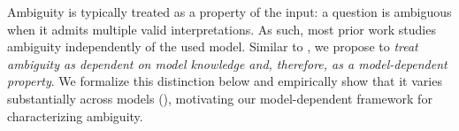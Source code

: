  Ambiguity is typically treated as a property of the input: a question is ambiguous when it admits multiple valid interpretations. As such, most prior work \citep{min-etal-2020-ambigqa,cole-etal-2023-selectively,liu-etal-2023-afraid,kim-etal-2023-tree,pmlr-v235-hou24b,NEURIPS2024_a4c942a8} studies ambiguity independently of the used model. Similar to \citet{kim-etal-2024-aligning}, we propose to \textit{treat ambiguity as dependent on model knowledge and, therefore, as a model-dependent property}. We formalize this distinction below and empirically show that it varies substantially across models (), motivating our model-dependent framework for characterizing ambiguity.


